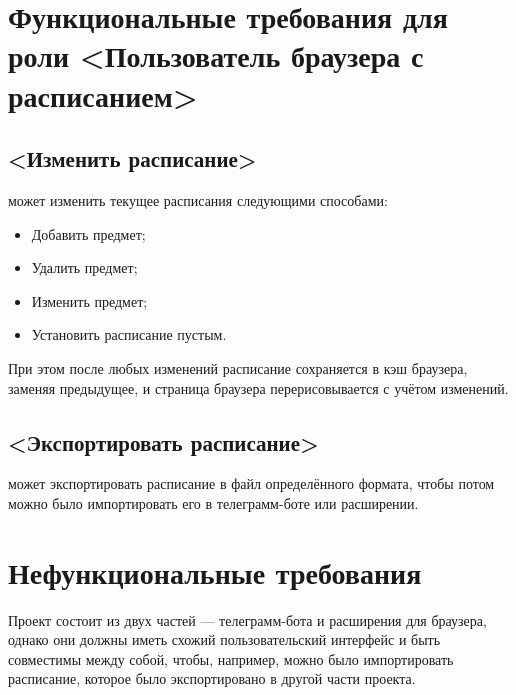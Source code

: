 	\section{Функциональные требования для роли <Пользователь браузера с расписанием>}
		\subsection{<Изменить расписание>}
			  может изменить текущее расписания следующими способами:
			\begin{itemize}
				\item Добавить предмет;
				
				\item Удалить предмет;
				
				\item Изменить предмет;
				
				\item Установить расписание пустым.
			\end{itemize}
			
			При этом после любых изменений расписание сохраняется в кэш браузера, заменяя предыдущее, и страница браузера перерисовывается с учётом изменений.
		\subsection{<Экспортировать расписание>}
			 может экспортировать расписание в файл определённого формата, чтобы потом можно было импортировать его в телеграмм-боте или расширении.
	\section{Нефункциональные требования}
		Проект состоит из двух частей --- телеграмм-бота и расширения для браузера, однако они должны иметь схожий пользовательский интерфейс и быть совместимы между собой, чтобы, например, можно было импортировать расписание, которое было экспортировано в другой части проекта.
